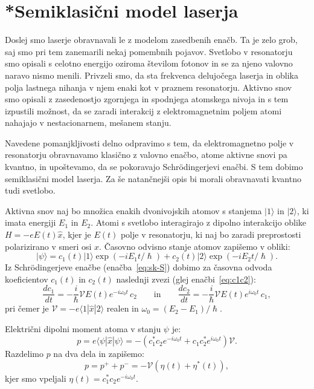 \section{*Semiklasični model laserja}
\label{chap:semiklasicni}
Doslej smo laserje obravnavali le z modelom zasedbenih enačb. Ta je zelo
grob, saj smo pri tem zanemarili nekaj pomembnih pojavov. Svetlobo v 
resonatorju smo opisali s celotno energijo oziroma številom fotonov in se za
njeno valovno naravo nismo menili. Privzeli smo, da sta frekvenca
delujočega laserja in oblika polja lastnega nihanja v njem enaki kot v
praznem resonatorju. Aktivno snov smo opisali z zasedenostjo zgornjega
in spodnjega atomskega nivoja in s tem izpustili možnost, da se zaradi
interakcij z elektromagnetnim poljem atomi nahajajo v nestacionarnem,
mešanem stanju.

Navedene pomanjkljivosti delno odpravimo s tem, da elektromagnetno polje v
resonatorju obravnavamo klasično z valovno enačbo, atome aktivne snovi pa
kvantno, in upoštevamo, da se pokoravajo Schr\"odingerjevi enačbi. S tem dobimo 
semiklasični model laserja. Za še natančnejši opis bi morali obravnavati
kvantno tudi svetlobo.

Aktivna snov naj bo množica enakih dvonivojskih 
atomov s stanjema $|1\rangle$ in $|2\rangle$, ki imata energiji $E_1$ in $E_2$.
Atomi s svetlobo interagirajo z dipolno interakcijo oblike $H = -eE(t)\hat{x}$, 
kjer je $E(t)$ polje v resonatorju, ki naj bo zaradi preprostosti 
polarizirano v smeri osi $x$. Časovno odvisno stanje atomov
zapišemo v obliki:
\begin{equation}  \label{5.45}
|\psi\rangle=c_1(t)|1\rangle\exp(-iE_1t/\hslash)+
c_2(t)|2\rangle\exp(-iE_2t/\hslash).
\end{equation}
Iz Schr\"odingerjeve enačbe (enačba~\ref{eq:sk-S}) dobimo za časovna odvoda
koeficientov $c_1(t)$ in $c_2(t)$ naslednji zvezi
(glej enačbi~\ref{eq:c1c2}):
\begin{equation}
\frac{d c_1}{dt}=-\frac{i}{\hslash} \mathcal{V} E(t) e^{-i\omega_0 t}\, c_2 
\qquad \mathrm{in} \qquad
\frac{d c_2}{dt}=-\frac{i}{\hslash} \mathcal{V} E(t) e^{i\omega_0 t}\, c_1,
\label{5.46}
\end{equation}
pri čemer je $\mathcal{V} = -e\langle1|\hat{x}|2\rangle$ realen in $\omega_0=(E_2-E_1)/\hslash$.

Električni dipolni moment atoma v stanju ${\psi}$ je:
\begin{equation}  
\label{5.47}
p=e\langle\psi|\hat{x}|\psi\rangle=-
(c_1^{\ast}c_2e^{-i \omega_0t}+c_1c_2^{\ast}e^{i \omega_0 t}) \mathcal{V}.
\end{equation}
Razdelimo $p$ na dva dela in zapišemo:
\begin{equation}  
\label{5.48}
p=p^+ + p^-=-\mathcal{V}\left(\eta(t)+\eta^{\ast}(t)\right)\!\!,
\end{equation}
kjer smo vpeljali $\eta(t)=c_1^{\ast}c_2e^{-i \omega_0 t}$.

